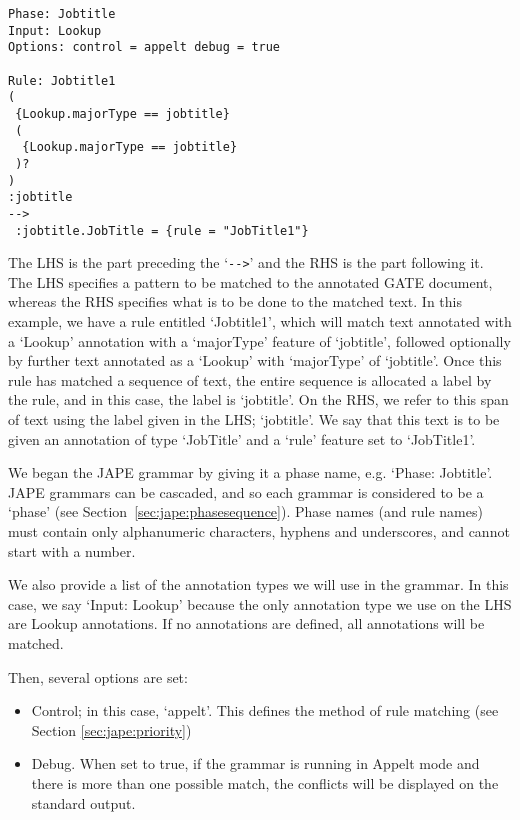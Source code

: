 \begin{small}
\begin{verbatim}
Phase: Jobtitle
Input: Lookup
Options: control = appelt debug = true

Rule: Jobtitle1
(
 {Lookup.majorType == jobtitle} 
 (
  {Lookup.majorType == jobtitle} 
 )?
)
:jobtitle
-->
 :jobtitle.JobTitle = {rule = "JobTitle1"}
\end{verbatim}
\end{small}

The LHS is the part preceding the `\verb|-->|' and the RHS is the part following
it. The LHS specifies a pattern to be matched to the annotated GATE document, whereas the
RHS specifies what is to be done to the matched text. In this example, we have a
rule entitled `Jobtitle1', which will match text annotated with a `Lookup'
annotation with a `majorType' feature of `jobtitle', followed optionally by
further text annotated as a `Lookup' with `majorType' of `jobtitle'. Once this
rule has matched a sequence of text, the entire sequence is allocated a label by
the rule, and in this case, the label is `jobtitle'. On the RHS, we refer to this
span of text using the label given in the LHS; `jobtitle'. We say that this text
is to be given an annotation of type `JobTitle' and a `rule' feature set to
`JobTitle1'.

We began the JAPE grammar by giving it a phase name, e.g. `Phase: Jobtitle'. JAPE
grammars can be cascaded, and so each grammar is considered to be a `phase' (see
Section~\ref{sec:jape:phasesequence}). 
Phase names (and rule names) must contain only alphanumeric characters, hyphens
and underscores, and cannot start with a number.

We also provide a list of the annotation
types we will use in the grammar. In this case, we say `Input: Lookup' because
the only annotation type we use on the LHS are Lookup annotations. If no
annotations are defined, all annotations will be matched.

Then, several options are set:

\begin{itemize}

\item Control; in this case, `appelt'. This defines the method of rule matching
(see Section \ref{sec:jape:priority})

\item Debug. When set to true, if the grammar is running in Appelt
mode and there is more than one possible match, the conflicts will be
displayed on the standard output.

\end{itemize}

